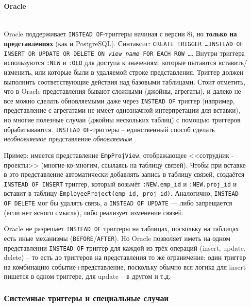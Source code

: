 \paragraph{\textbf{Oracle}} ~\\

 Oracle поддерживает \texttt{INSTEAD OF}-триггеры начиная с версии 8i, но \textbf{только на представлениях} (как и PostgreSQL). Синтаксис: \texttt{CREATE TRIGGER \ldots INSTEAD OF INSERT OR UPDATE OR DELETE ON \emph{view\_name} FOR EACH ROW \ldots}. Внутри триггера используются \texttt{:NEW} и \texttt{:OLD} для доступа к значениям, которые пытаются вставить/изменить, или которые были в удаляемой строке представления. Триггер должен выполнить соответствующие действия над базовыми таблицами. Стоит отметить, что в Oracle представления бывают сложными (джойны, агрегаты), и далеко не все можно сделать обновляемыми даже через \texttt{INSTEAD OF} триггер (например, представление с агрегатами не имеет однозначной интерпретации для вставки), но многие полезные случаи (джойны нескольких таблиц) с помощью триггеров обрабатываются. \texttt{INSTEAD OF}-триггеры – единственный способ сделать \textit{необновляемое} представление \textit{обновляемым} \autocite{oracledbdoc8}.
 
 Пример: имеется представление \texttt{EmpProjView}, отображающее <<сотрудник - проекты>> (многие-ко-многим, ссылаясь на таблицу связей). Чтобы при вставке в это представление автоматически добавлять запись в таблицу связей, создаётся \texttt{INSTEAD OF INSERT} триггер, который возьмёт \texttt{:NEW.emp\_id} и \texttt{:NEW.proj\_id} и вставит в таблицу \texttt{EmployeeProject(emp\_id, proj\_id)}. Аналогично, \texttt{INSTEAD OF DELETE} мог бы удалять связь, а \texttt{INSTEAD OF UPDATE} — либо запрещается (если нет ясного смысла), либо реализует изменение связей.
 
 Oracle не разрешает \texttt{INSTEAD OF} триггеры на таблицах, поскольку на таблицах есть иные механизмы (\texttt{BEFORE}/\texttt{AFTER}). Но Oracle позволяет иметь на одном представлении \texttt{INSTEAD OF}-триггер для каждой из трёх операций (insert, update, delete) – то есть до триггеров на представления то же ограничение: один триггер на комбинацию событие+представление, поскольку обычно вся логика для insert пишется в одном триггере, для update – в другом и т.д.

 \subsubsection{Системные триггеры и специальные случаи}

